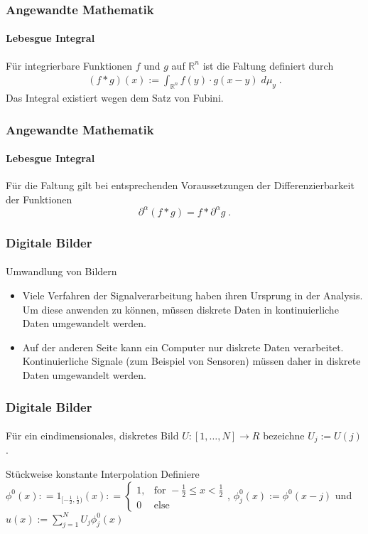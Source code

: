 \documentclass{beamer}
\begin{document}
\begin{frame}
    \frametitle{Angewandte Mathematik}
\framesubtitle{Lebesgue Integral}
\begin{block}{}
Für integrierbare Funktionen  $f$ und $g$ auf $\mathbb{R}^n$ ist die Faltung definiert durch
\begin{align}
(f * g )(x) := \int_{\mathbb{R}^n}  f(y) \cdot g(x-y) \; d \mu_y  \; .
\end{align}
Das Integral existiert wegen dem Satz von Fubini.
\end{block}
 \end{frame}





\begin{frame}
    \frametitle{Angewandte Mathematik}
\framesubtitle{Lebesgue Integral}
\begin{block}{}
Für die Faltung gilt bei entsprechenden Voraussetzungen der Differenzierbarkeit der Funktionen 
$$ \partial^{\alpha} (f  * g) = f * \partial^{\alpha} g \; .$$
\end{block}
 \end{frame}





\begin{frame}
    \frametitle{Digitale Bilder}
\framesubtitle{}
    \begin{block}{Umwandlung von Bildern}
\begin{itemize}
\item Viele Verfahren der  Signalverarbeitung haben ihren Ursprung in der Analysis. Um diese anwenden zu können, müssen diskrete Daten  in kontinuierliche Daten umgewandelt werden.
\item Auf der anderen Seite kann  ein Computer nur diskrete Daten  verarbeitet. Kontinuierliche Signale (zum Beispiel von Sensoren) müssen daher in diskrete Daten umgewandelt werden.
\end{itemize}
\end{block}

 \end{frame}

\begin{frame}
    \frametitle{Digitale Bilder}
\framesubtitle{}
    \begin{block}{}
Für ein eindimensionales, diskretes Bild $U : [1, \ldots, N]  \to R$ bezeichne  $U_{j} := U(j)$.
\end{block}
    \begin{block}{Stückweise konstante Interpolation}
Definiere $\phi^0 (x) : = 1_{ [-\frac{1} {2} ,  \frac{1} {2}) }(x) : =\begin{cases}
   1 , & \text{for } -\frac{1} {2}  \leq x < \frac{1} {2}  \\
    0  & \text{else } 
  \end{cases} $, $\phi^0_j(x):= \phi^0 (x - j)$ und
 $u(x) := \sum_{j=1}^{N} U_j \phi^0_j(x)$ 
\end{block}

 \end{frame}
\end{document}
